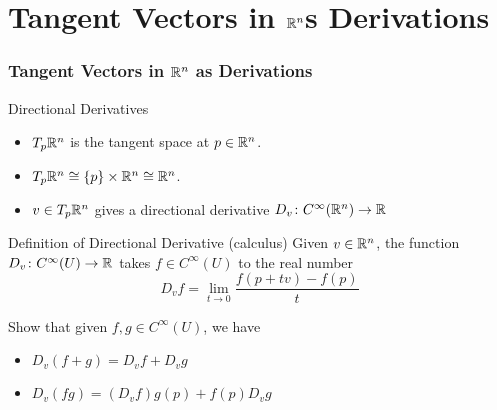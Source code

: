 \section{Tangent Vectors in \texorpdfstring{$\mathbb R^n$} as Derivations}
\begin{frame}
  \frametitle{Tangent Vectors in $\mathbb R^n$ as Derivations}
  \begin{block}
    {Directional Derivatives}
  \begin{itemize}
    \item $T_p\mathbb R^n$ is the tangent space at $p \in \mathbb R^n$.
    \item $T_p \mathbb R^n \cong \{p\} \times \mathbb R^n \cong \mathbb R^n$.
    \item $v \in T_p\mathbb R^n$ gives a directional derivative $D_v \colon
      C^{\infty}(\mathbb R^n) \to \mathbb R$
  \end{itemize}
  \end{block}
  \begin{block}
    {Definition of Directional Derivative (calculus)}
    Given $v \in \mathbb R^n$, the function $D_v \colon C^{\infty}(U) \to \mathbb R$ takes 
    $f \in C^{\infty}(U)$ to the real number 
    \begin{displaymath}
      D_vf = \lim_{t \to 0} \frac{f(p + tv) - f(p)}{t}
    \end{displaymath}
  \end{block}
  \begin{exercise}
    Show that given $f, g \in C^{\infty}(U)$, we have 
    \begin{itemize}
      \item $D_v(f+g) = D_vf + D_v g$
      \item $D_v(fg) = (D_vf)g(p) + f(p)D_vg$
    \end{itemize}
  \end{exercise}
\end{frame}
